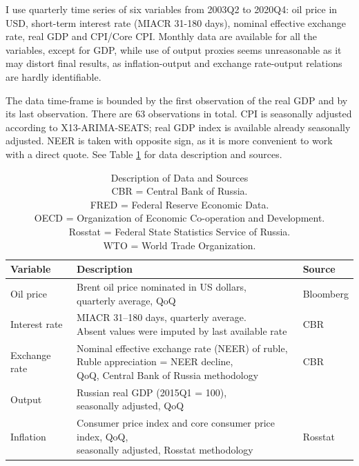 \documentclass[12pt, a4paper]{extarticle}
\begin{document}
I use quarterly time series of six variables from 2003Q2 to 2020Q4: oil price in USD, short-term interest rate (MIACR 31-180 days), nominal effective exchange rate, real GDP and CPI/Core CPI. Monthly data are available for all the variables, except for GDP, while use of output proxies seems unreasonable as it may distort final results, as inflation-output and exchange rate-output relations are hardly identifiable.

The data time-frame is bounded by the first observation of the real GDP and by its last observation. There are 63 observations in total. CPI is seasonally adjusted according to X13-ARIMA-SEATS; real GDP index is available already seasonally adjusted. NEER is taken with opposite sign, as it is more convenient to work with a direct quote. See Table \ref{table:variables_decription} for data description and sources.

\begin{table}[b!]
	\centering
	\begin{tabular}{@{}lll@{}}
		\toprule
		Variable  & Description                                              & Source    \\ \midrule
		Oil price & \makecell[l]{Brent oil price nominated in US dollars, \\quarterly average, QoQ} & Bloomberg \\
		Interest rate & \makecell[l]{MIACR 31--180 days, quarterly average. \\Absent values were imputed by last available rate} & CBR        \\
		Exchange rate & \makecell[l]{Nominal effective exchange rate (NEER) of ruble, \\Ruble appreciation = NEER decline, \\QoQ, Central Bank of Russia methodology} & CBR        \\
		Output        & \makecell[l]{Russian real GDP (2015Q1 = 100), \\seasonally adjusted, QoQ}  & \makecell[l]{FRED} \\
		Inflation & \makecell[l]{Consumer price index and core consumer price index, QoQ, \\seasonally adjusted, Rosstat methodology }          & Rosstat   \\ \bottomrule
	\end{tabular}%
	\caption{Description of Data and Sources\\	
		CBR = Central Bank of Russia.\\
		FRED = Federal Reserve Economic Data.\\
		OECD = Organization of Economic Co-operation and Development.\\
		Rosstat = Federal State Statistics Service of Russia.\\
		WTO = World Trade Organization.}
	\label{table:variables_decription}
\end{table}
\end{document}
